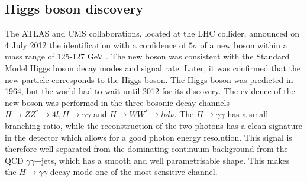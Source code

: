 \subsection{Higgs boson discovery}
\label{chap1:H2012:HM}
The ATLAS and CMS collaborations, located at the LHC collider, announced on 4 July 2012 the identification with a confidence of $5\sigma$ of a new boson within a mass range of 125-127 GeV \cite{ATLAS_2012, CMS_2012}. The new boson was consistent with the Standard Model Higgs boson decay modes and signal rate. Later, it was confirmed that the new particle corresponds to the Higgs boson. The Higgs boson was predicted in 1964, but the world had to wait until 2012 for its discovery. The evidence of the new boson was performed in the three bosonic decay channels $H\rightarrow ZZ^* \rightarrow 4l, H\rightarrow\gamma\gamma$ and $H\rightarrow WW^*\rightarrow l\nu l\nu$. The $H\rightarrow\gamma\gamma$ has a small branching ratio, while the reconstruction of the two photons has a clean signature in the detector which allows for a good photon energy resolution. This signal is therefore well separated from the dominating continuum background from the QCD $\gamma\gamma$+jets, which has a smooth and well parametrisable shape. This makes the $H\rightarrow\gamma\gamma$ decay mode one of the most sensitive channel.

